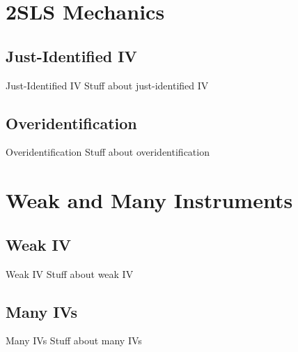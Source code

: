 \documentclass{beamer}
\begin{document}
\section{2SLS Mechanics}

\subsection{Just-Identified IV}
\begin{frame}{Just-Identified IV}
Stuff about just-identified IV
\end{frame}

\subsection{Overidentification}
\begin{frame}{Overidentification}
Stuff about overidentification
\end{frame}

\section{Weak and Many Instruments}

\subsection{Weak IV}
\begin{frame}{Weak IV}
Stuff about weak IV
\end{frame}

\subsection{Many IVs}
\begin{frame}{Many IVs}
Stuff about many IVs
\end{frame}
\end{document}
